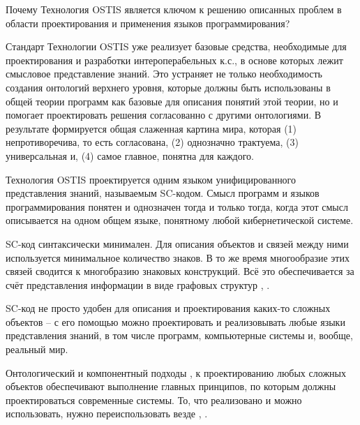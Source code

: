 Почему Технология OSTIS является ключом к решению описанных проблем в области проектирования и применения языков программирования?
\begin{textitemize}
    \item {Стандарт Технологии OSTIS \cite{Standard2021} уже реализует базовые средства, необходимые для проектирования и разработки интероперабельных к.с., в основе которых лежит смысловое представление знаний. Это устраняет не только необходимость создания онтологий верхнего уровня, которые должны быть использованы в общей теории программ как базовые для описания понятий этой теории, но и помогает проектировать решения согласованно с другими онтологиями. В результате формируется общая слаженная картина мира, которая (1) непротиворечива, то есть согласована, (2) однозначно трактуема, (3) универсальная и, (4) самое главное, понятна для каждого.}
    \item {Технология OSTIS проектируется одним языком унифицированного представления знаний, называемым SC-кодом. Смысл программ и языков программирования понятен и однозначен тогда и только тогда, когда этот смысл описывается на одном общем языке, понятному любой кибернетической системе.}
    \item {SC-код синтаксически минимален. Для описания объектов и связей между ними используется минимальное количество знаков. В то же время многообразие этих связей сводится к многобразию знаковых конструкций. Всё это обеспечивается за счёт представления информации в виде графовых структур \cite{Kasyanov2003}, \cite{Petrov1978}.}
    \item {SC-код не просто удобен для описания и проектирования каких-то сложных объектов -- с его помощью можно проектировать и реализовывать любые языки представления знаний, в том числе программ, компьютерные системы и, вообще, реальный мир.}
    \item {Онтологический и компонентный подходы \cite{Sales2022}, \cite{Samaa2020} к проектированию любых сложных объектов обеспечивают выполнение главных принципов, по которым должны проектироваться современные системы. То, что реализовано и можно использовать, нужно переиспользовать везде \cite{O4IS2007}, \cite{Molorodov2019}.}
\end{textitemize}

